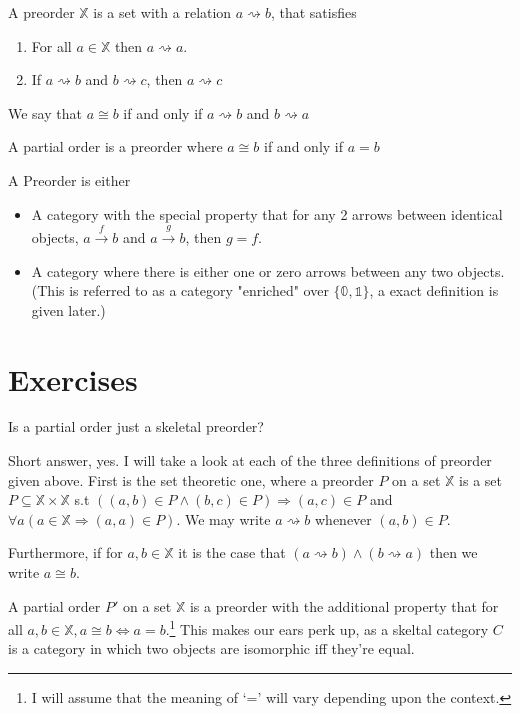 \begin{definition*}[Preorder]
    A preorder $\mathbb{X}$ is a set with a relation $a \rightsquigarrow b$, that satisfies
    \begin{enumerate}
        \item For all $a \in \mathbb{X}$ then $a \rightsquigarrow a$.
        \item If $a \rightsquigarrow b$ and $b \rightsquigarrow c$, then $a \rightsquigarrow c$
    \end{enumerate}
    We say that $a \cong b$ if and only if $a \rightsquigarrow b$ and $b \rightsquigarrow a$
\end{definition*}
\begin{definition*}
    A partial order is a preorder where $a \cong b$ if and only if $a=b$
\end{definition*}
\begin{definition*}
    A Preorder is either 
    \begin{itemize}
        \item A category with the special property that for any 2 arrows between identical objects, $a \xrightarrow{f} b$ and $a \xrightarrow{g} b$, then $g=f$.
        \item A category where there is either one or zero arrows between any two objects. (This is referred to as a category "enriched" over $\{\mathbb{0},\mathbb{1}\}$, a exact definition is given later.) 
    \end{itemize}
    
\end{definition*}

\section{Exercises}
\begin{Exercise}
    Is a partial order just a skeletal preorder?
    
    Short answer, yes. I will take a look at each of the three definitions of preorder given above. First is the set theoretic one, where a preorder $P$ on a set $\mathbb{X}$ is a set $P \subseteq \mathbb{X} \times \mathbb{X}$ s.t $((a,b) \in P \land (b,c) \in P)\Rightarrow (a,c) \in P$ and $\forall a (a \in \mathbb{X} \Rightarrow (a,a) \in P)$. We may write $a \rightsquigarrow b$ whenever $(a,b) \in P$. 
    
    Furthermore,  if for $a,b \in \mathbb{X}$ it is the case that $(a \rightsquigarrow b) \land (b \rightsquigarrow a)$ then we write $a \cong b$. 

    A partial order $P'$ on a set $\mathbb{X}$ is a preorder with the additional property that for all $a,b \in \mathbb{X},  a\cong b \iff a = b$.\footnote{I will assume that the meaning of `=' will vary depending upon the context.} This makes our ears perk up, as a skeltal category $C$ is a category in which two objects are isomorphic iff they're equal. 

    
\end{Exercise}

